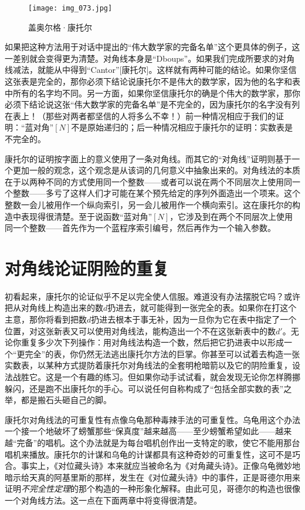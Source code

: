\begin{figure}
\texttt{[image: img\_073.jpg]}
\caption[盖奥尔格·康托尔。]
  {盖奥尔格·康托尔}
\end{figure}

如果把这种方法用于对话中提出的“伟大数学家的完备名单”这个更具体的例子，这一差别就会变得更为清楚。对角线本身是“Dboups”。如果我们完成所要求的对角线减法，就能从中得到“Cantor”[康托尔]。这样就有两种可能的结论。如果你坚信这张表是完全的，那你必须下结论说康托尔不是伟大的数学家，因为他的名字和表中所有的名字均不同。另一方面，如果你坚信康托尔的确是个伟大的数学家，那你必须下结论说这张“伟大数学家的完备名单”是不完全的，因为康托尔的名字没有列在表上！（那些对两者都坚信的人将多么不幸！）前一种情况相应于我们的证明：“蓝对角”$[N]$不是原始递归的；后一种情况相应于康托尔的证明：实数表是不完全的。

康托尔的证明按字面上的意义使用了一条对角线。而其它的“对角线”证明则基于一个更加一般的观念，这个观念是从该词的几何意义中抽象出来的。对角线法的本质在于以两种不同的方式使用同一个整数——或者可以说在两个不同层次上使用同一个整数——多亏了这样人们才可能在某个预先给定的序列外面造出一个项来。这个整数一会儿被用作一个纵向索引，另一会儿被用作一个横向索引。这在康托尔的构造中表现得很清楚。至于说函数“蓝对角”$[N]$，它涉及到在两个不同层次上使用同一个整数——首先作为一个蓝程序索引编号，然后再作为一个输入参数。

\section{对角线论证阴险的重复}

初看起来，康托尔的论证似乎不足以完全使人信服。难道没有办法摆脱它吗？或许把从对角线上构造出来的数$d$扔进去，就可能得到一张完全的表。如果你在打这个主意，那你将看到把数$d$扔进去根本于事无补，因为一旦你为它在表中指定了一个位置，对这张新表又可以使用对角线法，能构造出一个不在这张新表中的数$d'$。无论你重复多少次下列操作：用对角线法构造一个数，然后把它扔进表中以形成一个“更完全”的表，你仍然无法逃出康托尔方法的巨掌。你甚至可以试着去构造一张实数表，以某种方式提防着康托尔对角线法的全套明枪暗箭以及它的阴险重复，设法战胜它。这是一个有趣的练习。但如果你动手试试看，就会发现无论你怎样腾挪躲闪，还是跑不出康托尔的手心。可以说任何自称构成了“包括全部实数的表”之举，都是搬石头砸自己的脚。

康托尔对角线法的可重复性有点像乌龟那种毒辣手法的可重复性。乌龟用这个办法一个接一个地破坏了螃蟹那些“保真度”越来越高——至少螃蟹希望如此——越来越“完备”的唱机。这个办法就是为每台唱机创作出一支特定的歌，使它不能用那台唱机来播放。康托尔的计谋和乌龟的计谋都具有这种奇妙的可重复性，这可不是巧合。事实上，《对位藏头诗》本来就应当被命名为《对角藏头诗》。正像乌龟微妙地暗示给天真的阿基里斯的那样，发生在《对位藏头诗》中的事件，正是哥德尔用来证明\emph{不完全性定理}的那个构造的一种形象化解释。由此可见，哥德尔的构造也很像一个对角线方法。这一点在下面两章中将变得很清楚。

